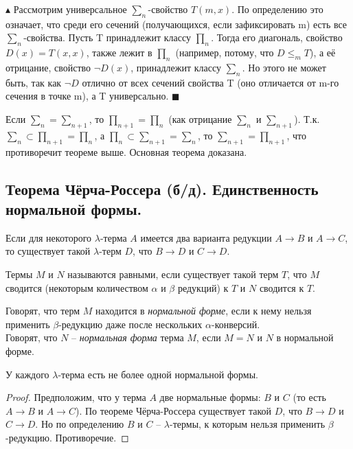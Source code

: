 $\blacktriangle$
Рассмотрим универсальное $\sum_n$-свойство $T(m, x)$. По определению это означает, что среди его сечений (получающихся, если зафиксировать m) есть все $\sum_n$-свойства. Пусть T принадлежит классу $\prod_n$. Тогда его диагональ, свойство $D(x) = T(x, x)$, также лежит в $\prod_n$ (например, потому, что $D \leqslant_m T$), а её отрицание, свойство $\neg D(x)$, принадлежит классу $\sum_n$. Но этого не может быть, так как $\neg D$ отлично от всех сечений свойства T (оно отличается от m-го сечения в точке m), а T универсально.
$\blacksquare$

Если $\sum_n = \sum_{n+1}$, то $\prod_{n+1} = \prod_n$ (как отрицание $\sum_n$ и $\sum_{n+1}$). Т.к. $\sum_n \subset \prod_{n+1} = \prod_n$, а $\prod_n \subset \sum_{n+1} = \sum_n$, то $\sum_{n+1} = \prod_{n+1}$, что противоречит теореме выше. Основная теорема доказана. 

\subsection{Теорема Чёрча-Россера (б/д). Единственность нормальной формы.}

\begin{theorem}
    Если для некоторого $\lambda$-терма $A$ имеется два варианта редукции $A \rightarrow B$ и $A \rightarrow C$, то существует такой $\lambda$-терм $D$, что $B \rightarrow D$ и $C \rightarrow D$.
\end{theorem}

\begin{definition}
    Термы $M$ и $N$ называются равными, если существует такой терм $T$, что $M$ сводится (некоторым количеством $\alpha$ и $\beta$ редукций) к $T$ и $N$ сводится к $T$.
\end{definition}

\begin{definition}
    Говорят, что терм $M$ находится в \textit{нормальной форме}, если к нему нельзя применить $\beta$-редукцию даже после нескольких $\alpha$-конверсий.\\
    Говорят, что $N$ -- \textit{нормальная форма} терма $M$, если $M=N$ и $N$ в нормальной форме.
\end{definition}

\begin{corollary}
    У каждого $\lambda$-терма есть не более одной нормальной формы.
    
    \begin{proof}
        Предположим, что у терма $A$ две нормальные формы: $B$ и $C$ (то есть $A \rightarrow B$ и $A \rightarrow C$). По теореме Чёрча-Россера существует такой $D$, что $B \rightarrow D$ и $C \rightarrow D$. Но по определению $B$ и $C$ -- $\lambda$-термы, к которым нельзя применить $\beta$-редукцию. Противоречие.
    \end{proof}
    
\end{corollary}


